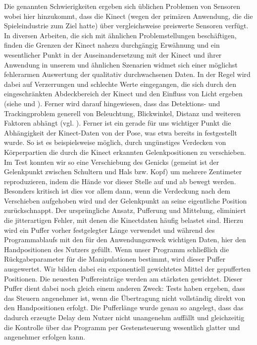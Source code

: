 	Die genannten Schwierigkeiten ergeben sich üblichen Problemen von Sensoren wobei hier hinzukommt, dass die Kinect (wegen der primären Anwendung, die die Spieleindustrie zum Ziel hatte) über vergleichsweise preiswerte Sensoren verfügt. In diversen Arbeiten, die sich mit ähnlichen Problemstellungen beschäftigen, finden die Grenzen der Kinect nahezu durchgängig Erwähnung und ein wesentlicher Punkt in der Auseinandersetzung mit der Kinect und ihrer Anwendung in unserem und ähnlichen Szenarien widmet sich einer möglichst fehlerarmen Auswertung der qualitativ durchwachsenen Daten. In der Regel wird dabei auf Verzerrungen und schlechte Werte eingegangen, die sich durch den eingeschränkten \glqq Abdeckbereich\grqq{} der Kinect und den Einfluss von Licht ergeben (siehe \cite{bodyprop} und \cite{kinectlight}). Ferner wird darauf hingewiesen, dass das Detektions- und Trackingproblem generell von Beleuchtung, Blickwinkel, Distanz und weiteren Faktoren abhängt (vgl. \cite{thermalsens}). Ferner ist ein gerade für uns wichtiger Punkt die Abhängigkeit der Kinect-Daten von der Pose, was etwa bereits in \cite{biomid} festgestellt wurde. So ist es beispielsweise möglich, durch ungünstiges Verdecken von Körperpartien die durch die Kinect erkannten Gelenkpositionen zu verschieben. Im Test konnten wir so eine Verschiebung des Genicks (gemeint ist der Gelenkpunkt zwischen Schultern und Hals bzw. Kopf) um mehrere Zentimeter reproduzieren, indem die Hände vor dieser Stelle auf und ab bewegt werden. Besonders kritisch ist dies vor allem dann, wenn die Verdeckung nach dem Verschieben aufgehoben wird und der Gelenkpunkt an seine eigentliche Position \glqq zurückschnappt\grqq{}.
	Der ursprüngliche Ansatz, Pufferung und Mittelung, eliminiert die jitterartigen Fehler, mit denen die Kinectdaten häufig belastet sind. Hierzu wird ein Puffer vorher festgelegter Länge verwendet und während des Programmablaufs mit den für den Anwendungszweck wichtigen Daten, hier den Handpositionen des Nutzers gefüllt. Wenn unser Programm schließlich die Rückgabeparameter für die Manipulationen bestimmt, wird dieser Puffer ausgewertet. Wir bilden dabei ein exponentiell gewichtetes Mittel der gepufferten Positionen. Die neuesten Puffereinträge werden am stärksten gewichtet. Dieser Puffer dient dabei noch gleich einem anderen Zweck: Tests haben ergeben, dass das Steuern angenehmer ist, wenn die Übertragung nicht vollständig direkt von den Handpositionen erfolgt. Die Pufferlänge wurde genau so angelegt, dass das dadurch erzeugte Delay dem Nutzer nicht unangenehm auffällt und gleichzeitig die Kontrolle über das Programm per Gestensteuerung wesentlich glatter und angenehmer erfolgen kann.\par 
